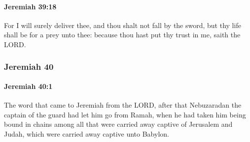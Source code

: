 		\paragraph{Jeremiah 39:18} %
			\label{JEREMIAH-39-18}

			For I will surely deliver thee, and thou shalt not fall by the sword, but thy life shall be for a prey unto thee: because thou hast put thy trust in me, saith the LORD.

	\subsubsection{Jeremiah 40} %
		\label{JEREMIAH-40}

		\paragraph{Jeremiah 40:1} %
			\label{JEREMIAH-40-1}

			The word that came to Jeremiah from the LORD, after that Nebuzaradan the captain of the guard had let him go from Ramah, when he had taken him being bound in chains among all that were carried away captive of Jerusalem and Judah, which were carried away captive unto Babylon.

